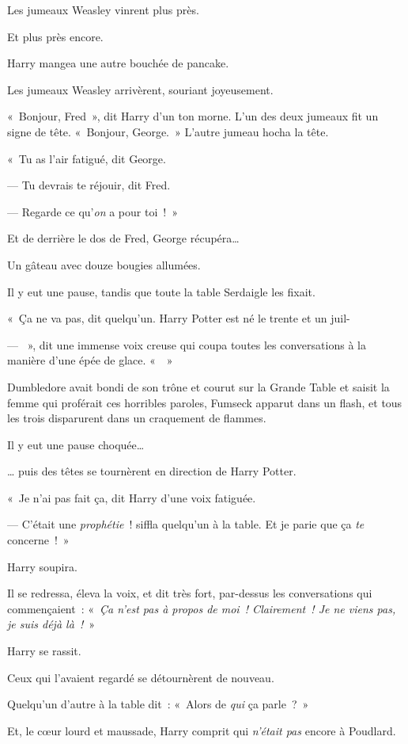 Les jumeaux Weasley vinrent plus près.

Et plus près encore.

Harry mangea une autre bouchée de pancake.

Les jumeaux Weasley arrivèrent, souriant joyeusement.

«~Bonjour, Fred~», dit Harry d'un ton morne. L'un des deux jumeaux fit un signe de tête. «~Bonjour, George.~» L'autre jumeau hocha la tête.

«~Tu as l'air fatigué, dit George.

--- Tu devrais te réjouir, dit Fred.

--- Regarde ce qu'\emph{on} a pour toi~!~»

Et de derrière le dos de Fred, George récupéra…

Un gâteau avec douze bougies allumées.

Il y eut une pause, tandis que toute la table Serdaigle les fixait.

«~Ça ne va pas, dit quelqu'un. Harry Potter est né le trente et un juil-

--- ~», dit une immense voix creuse qui coupa toutes les conversations à la manière d'une épée de glace. «~~»

Dumbledore avait bondi de son trône et courut sur la Grande Table et saisit la femme qui proférait ces horribles paroles, Fumseck apparut dans un flash, et tous les trois disparurent dans un craquement de flammes.

Il y eut une pause choquée…

… puis des têtes se tournèrent en direction de Harry Potter.

«~Je n'ai pas fait ça, dit Harry d'une voix fatiguée.

--- C'était une \emph{prophétie}~! siffla quelqu'un à la table. Et je parie que ça \emph{te} concerne~!~»

Harry soupira.

Il se redressa, éleva la voix, et dit très fort, par-dessus les conversations qui commençaient~: «~\emph{Ça n'est pas à propos de moi~! Clairement~! Je ne viens pas, je suis déjà là~!}~»

Harry se rassit.

Ceux qui l'avaient regardé se détournèrent de nouveau.

Quelqu'un d'autre à la table dit~: «~Alors de \emph{qui} ça parle~?~»

Et, le cœur lourd et maussade, Harry comprit qui \emph{n'était pas} encore à Poudlard.

